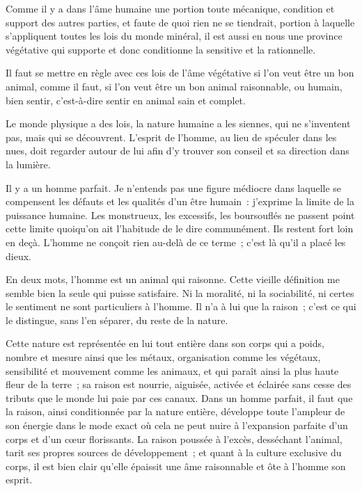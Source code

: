 \documentclass[french,twoside]{book} %
\newcommand{\astermono}{\medskip\centerline{\color{rubric}\large\selectfont{\syms ✻}}\medskip\par}%
\begin{document}
\astermono

\noindent Comme il y a dans l’âme humaine une portion toute mécanique, condition et support des autres parties, et faute de quoi rien ne se tiendrait, portion à laquelle s’appliquent toutes les lois du monde minéral, il est aussi en nous une province végétative qui supporte et donc conditionne la sensitive et la rationnelle.\par
Il faut se mettre en règle avec ces lois de l’âme végétative si l’on veut être un bon animal, comme il faut, si l’on veut être un bon animal raisonnable, ou humain, bien sentir, c’est-à-dire sentir en animal sain et complet.\par

\astermono

\noindent Le monde physique a des lois, la nature humaine a les siennes, qui ne s’inventent pas, mais qui se découvrent. L’esprit de l’homme, au lieu de spéculer dans les nues, doit regarder autour de lui afin d’y trouver son conseil et sa direction dans la lumière.\par
Il y a un homme parfait. Je n’entends pas une figure médiocre dans laquelle se compensent les défauts et les qualités d’un être humain : j’exprime la limite de la puissance humaine. Les monstrueux, les excessifs, les boursouflés ne passent point cette limite quoiqu’on ait l’habitude de le dire communément. Ils restent fort loin en deçà. L’homme ne conçoit rien au-delà de ce terme ; c’est là qu’il a placé les dieux.\par
En deux mots, l’homme est un animal qui raisonne. Cette vieille définition me semble bien la seule qui puisse satisfaire. Ni la moralité, ni la sociabilité, ni certes le sentiment ne sont particuliers à l’homme. Il n’a à lui que la raison ; c’est ce qui le distingue, sans l’en séparer, du reste de la nature.\par
Cette nature est représentée en lui tout entière dans son corps qui a poids, nombre et mesure ainsi que les métaux, organisation comme les végétaux, sensibilité et mouvement comme les animaux, et qui paraît ainsi la plus haute fleur de la terre ; sa raison est nourrie, aiguisée, activée et éclairée sans cesse des tributs que le monde lui paie par ces canaux. Dans un homme parfait, il faut que la raison, ainsi conditionnée par la nature entière, développe toute l’ampleur de son énergie dans le mode exact où cela ne peut nuire à l’expansion parfaite d’un corps et d’un cœur florissants. La raison poussée à l’excès, desséchant l’animal, tarit ses propres sources de développement ; et quant à la culture exclusive du corps, il est bien clair qu’elle épaissit une âme raisonnable et ôte à l’homme son esprit.\par
\end{document}
